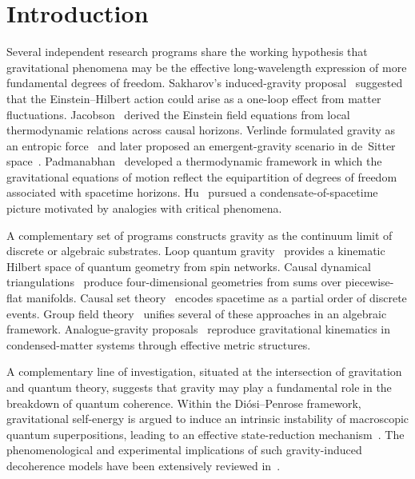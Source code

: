 \documentclass[pdflatex,sn-mathphys-num]{sn-jnl}%
\theoremstyle{thmstyleone}%
\theoremstyle{thmstyletwo}%
\theoremstyle{thmstylethree}%
\begin{document}
\section{Introduction}
\label{sec:introduction}

Several independent research programs share the working
hypothesis that gravitational phenomena may be the effective
long-wavelength expression of more fundamental degrees of
freedom. Sakharov's induced-gravity proposal~\cite{Sakharov1968}
suggested that the Einstein--Hilbert action could arise as a
one-loop effect from matter fluctuations.
Jacobson~\cite{Jacobson1995} derived the Einstein field
equations from local thermodynamic relations across causal
horizons. Verlinde formulated gravity as an entropic
force~\cite{Verlinde2011} and later proposed an emergent-gravity
scenario in de~Sitter space~\cite{Verlinde2017}.
Padmanabhan~\cite{Padmanabhan2010} developed a thermodynamic
framework in which the gravitational equations of motion
reflect the equipartition of degrees of freedom associated with
spacetime horizons. Hu~\cite{Hu2005} pursued a
condensate-of-spacetime picture motivated by analogies with
critical phenomena.

A complementary set of programs constructs gravity as the
continuum limit of discrete or algebraic substrates. Loop
quantum gravity~\cite{Rovelli2004,AshtekarLewandowski2004}
provides a kinematic Hilbert space of quantum geometry from
spin networks. Causal dynamical triangulations~\cite{AJL2012}
produce four-dimensional geometries from sums over
piecewise-flat manifolds. Causal set
theory~\cite{Sorkin1991} encodes spacetime as a partial order
of discrete events. Group field theory~\cite{Oriti2012} unifies
several of these approaches in an algebraic
framework. Analogue-gravity
proposals~\cite{Volovik2003,BarceloLiberatiVisser2011}
reproduce gravitational kinematics in condensed-matter systems
through effective metric structures.

A complementary line of investigation, situated at the
intersection of gravitation and quantum theory, suggests that
gravity may play a fundamental role in the breakdown of quantum
coherence. Within the Di\'osi--Penrose framework, gravitational
self-energy is argued to induce an intrinsic instability of
macroscopic quantum superpositions, leading to an effective
state-reduction mechanism~\cite{Diosi1989,Penrose1996}. The
phenomenological and experimental implications of such
gravity-induced decoherence models have been extensively
reviewed in~\cite{BassiGrossardtUlbricht2017}.
\end{document}
